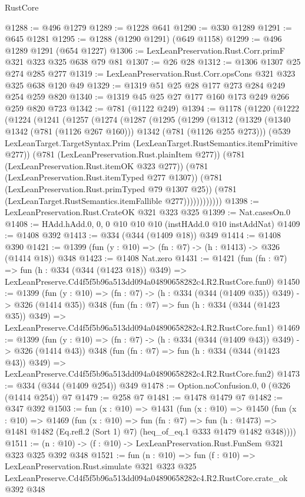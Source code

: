 \begin{lexlean}{RustCore}
\begin{coremodule}
@1288 := @496 @1279
@1289 := @1228 @641
@1290 := @330 @1289
@1291 := @645 @1281
@1295 := @1288 (@1290 @1291) (@649 @1158)
@1299 := @496 @1289 @1291 (@654 @1227)
@1306 := LexLeanPreservation.Rust.Corr.primF @321 @323 @325 @638 @79 @81
@1307 := @26 @28
@1312 := @1306 @1307 @25 @274 @285 @277
@1319 := LexLeanPreservation.Rust.Corr.opsCons @321 @323 @325 @638 @120 @49
@1329 := @1319 @51 @25 @28 @177 @273 @284 @249 @254 @259 @820
@1340 := @1319 @45 @25 @27 @177 @160 @173 @249 @266 @259 @820 @723
@1342 := @781 (@1122 @249)
@1394 := @1178
    (@1220
      (@1222
        (@1224
          (@1241
            (@1257
              (@1274
                (@1287
                  (@1295
                    (@1299
                      (@1312
                        (@1329
                          (@1340 @1342 (@781 (@1126 @267 @160)))
                          @1342
                          (@781 (@1126 @255 @273)))
                        (@539
                          LexLeanTarget.TargetSyntax.Prim
                          (LexLeanTarget.RustSemantics.itemPrimitive @277))
                        (@781 (LexLeanPreservation.Rust.plainItem @277))
                        (@781 (LexLeanPreservation.Rust.itemOK @323 @277))
                        (@781 (LexLeanPreservation.Rust.itemTyped @277 @1307))
                        (@781 (LexLeanPreservation.Rust.primTyped @79 @1307 @25))
                        (@781 (LexLeanTarget.RustSemantics.itemFallible @277))))))))))))
@1398 := LexLeanPreservation.Rust.CrateOK @321 @323 @325
@1399 := Nat.casesOn.{0}
@1408 := HAdd.hAdd.{0, 0, 0} @10 @10 @10 (instHAdd.{0} @10 instAddNat)
@1409 := @1408 @392
@1413 := @334 (@344 (@1409 @18)) @349
@1414 := @1408 @390
@1421 := @1399 (fun (y : @10) => (fn : @7) -> (h : @1413) -> @326 (@1414 @18)) @348
@1423 := @1408 Nat.zero
@1431 := @1421
    (fun (fn : @7) =>
    fun (h : @334 (@344 (@1423 @18)) @349) =>
    LexLeanPreserve.Cd4f5f5b96a513dd094a04890658282c4.R2.RustCore.fun0)
@1450 := @1399
    (fun (y : @10) => (fn : @7) -> (h : @334 (@344 (@1409 @35)) @349) -> @326 (@1414 @35))
    @348
    (fun (fn : @7) =>
    fun (h : @334 (@344 (@1423 @35)) @349) =>
    LexLeanPreserve.Cd4f5f5b96a513dd094a04890658282c4.R2.RustCore.fun1)
@1469 := @1399
    (fun (y : @10) => (fn : @7) -> (h : @334 (@344 (@1409 @43)) @349) -> @326 (@1414 @43))
    @348
    (fun (fn : @7) =>
    fun (h : @334 (@344 (@1423 @43)) @349) =>
    LexLeanPreserve.Cd4f5f5b96a513dd094a04890658282c4.R2.RustCore.fun2)
@1473 := @334 (@344 (@1409 @254)) @349
@1478 := Option.noConfusion.{0, 0} (@326 (@1414 @254)) @7
@1479 := @258 @7
@1481 := @1478 @1479 @7
@1482 := @347 @392
@1503 := fun (x : @10) =>
  @1431
    (fun (x : @10) =>
    @1450
      (fun (x : @10) =>
      @1469
        (fun (x : @10) =>
        fun (fn : @7) =>
        fun (h : @1473) =>
        @1481 @1482 (Eq.refl.{2} (Sort 1) @7) (heq_of_eq.{1} @333 @1479 @1482 @348))))
@1511 := (n : @10) -> (f : @10) -> LexLeanPreservation.Rust.FunSem @321 @323 @325 @392 @348
@1521 := fun (n : @10) =>
  fun (f : @10) =>
  LexLeanPreservation.Rust.simulate
    @321
    @323
    @325
    LexLeanPreserve.Cd4f5f5b96a513dd094a04890658282c4.R2.RustCore.crate_ok
    @392
    @348
\end{coremodule}
\end{lexlean}
